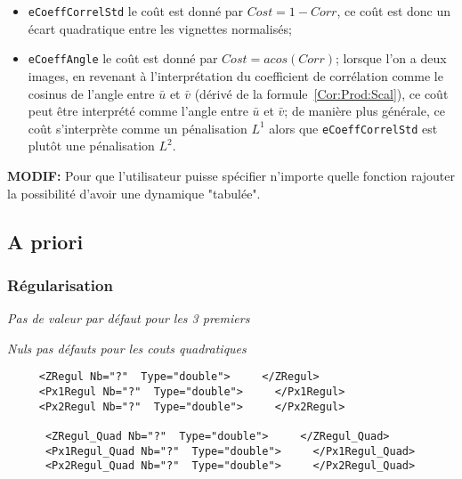 \begin{itemize}
   \item {\tt eCoeffCorrelStd} le co\^ut est  donn\'e par 
         $Cost=1-Corr$, ce co\^ut est donc un \'ecart quadratique
         entre les vignettes normalis\'es;
         

   \item {\tt eCoeffAngle} le co\^ut est  donn\'e par
         $Cost=acos(Corr)$; lorsque l'on a deux images,
         en revenant \`a l'interpr\'etation du coefficient
         de corr\'elation comme le cosinus de l'angle entre
         $\bar{u}$ et $\bar{v}$ (d\'eriv\'e de la formule~\ref{Cor:Prod:Scal}),
         ce co\^ut peut \^etre interpr\'et\'e comme l'angle entre
          $\bar{u}$ et $\bar{v}$; de mani\`ere plus g\'en\'erale,
         ce co\^ut s'interpr\`ete comme un p\'enalisation $L^1$
         alors que {\tt eCoeffCorrelStd} est plut\^ot une p\'enalisation
         $L^2$.

\end{itemize}

{\bf MODIF:}  Pour que l'utilisateur puisse sp\'ecifier n'importe
quelle fonction rajouter la possibilit\'e d'avoir une dynamique "tabul\'ee".

\subsection{A priori}

\subsubsection{R\'egularisation}

\emph{Pas de valeur par d\'efaut pour les 3 premiers}

\emph{Nuls pas d\'efauts pour les couts quadratiques}

\begin{verbatim}
     <ZRegul Nb="?"  Type="double">     </ZRegul>
     <Px1Regul Nb="?"  Type="double">     </Px1Regul>
     <Px2Regul Nb="?"  Type="double">     </Px2Regul>

      <ZRegul_Quad Nb="?"  Type="double">     </ZRegul_Quad>
      <Px1Regul_Quad Nb="?"  Type="double">     </Px1Regul_Quad>
      <Px2Regul_Quad Nb="?"  Type="double">     </Px2Regul_Quad>


\end{verbatim}


